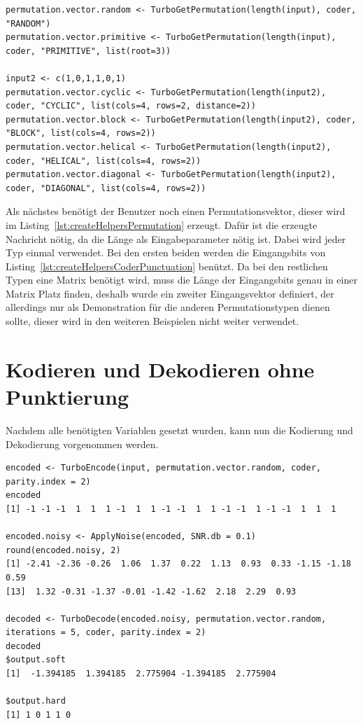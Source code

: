 \begin{lstlisting}[caption=Erzeugung von verschiedenen Permutationsvektoren, label={lst:createHelpersPermutation}, float=!th]
permutation.vector.random <- TurboGetPermutation(length(input), coder, "RANDOM")
permutation.vector.primitive <- TurboGetPermutation(length(input), coder, "PRIMITIVE", list(root=3))

input2 <- c(1,0,1,1,0,1)
permutation.vector.cyclic <- TurboGetPermutation(length(input2), coder, "CYCLIC", list(cols=4, rows=2, distance=2))
permutation.vector.block <- TurboGetPermutation(length(input2), coder, "BLOCK", list(cols=4, rows=2))
permutation.vector.helical <- TurboGetPermutation(length(input2), coder, "HELICAL", list(cols=4, rows=2))
permutation.vector.diagonal <- TurboGetPermutation(length(input2), coder, "DIAGONAL", list(cols=4, rows=2))
\end{lstlisting}

Als nächstes benötigt der Benutzer noch einen Permutationsvektor, dieser wird im Listing~\ref{lst:createHelpersPermutation} erzeugt. Dafür ist die erzeugte Nachricht nötig, da die Länge als Eingabeparameter nötig ist. Dabei wird jeder Typ einmal verwendet. Bei den ersten beiden werden die Eingangsbits von Listing~\ref{lst:createHelpersCoderPunctuation} benützt. Da bei den restlichen Typen eine Matrix benötigt wird, muss die Länge der Eingangsbits genau in einer Matrix Platz finden, deshalb wurde ein zweiter Eingangsvektor definiert, der allerdings nur als Demonstration für die anderen Permutationstypen dienen sollte, dieser wird in den weiteren Beispielen nicht weiter verwendet.

\FloatBarrier
\section{Kodieren und Dekodieren ohne Punktierung}
\label{sec:example_withoutPunctuation}
Nachdem alle benötigten Variablen gesetzt wurden, kann nun die Kodierung und Dekodierung vorgenommen werden.

\begin{lstlisting}[caption=Kodierung und Dekodierung ohne Punktierung, label={lst:encodeDecodeWithoutPunctuation}, float=!th]
encoded <- TurboEncode(input, permutation.vector.random, coder, parity.index = 2)
encoded
[1] -1 -1 -1  1  1  1 -1  1  1 -1 -1  1  1 -1 -1  1 -1 -1  1  1  1

encoded.noisy <- ApplyNoise(encoded, SNR.db = 0.1)
round(encoded.noisy, 2)
[1] -2.41 -2.36 -0.26  1.06  1.37  0.22  1.13  0.93  0.33 -1.15 -1.18  0.59
[13]  1.32 -0.31 -1.37 -0.01 -1.42 -1.62  2.18  2.29  0.93

decoded <- TurboDecode(encoded.noisy, permutation.vector.random, iterations = 5, coder, parity.index = 2)
decoded
$output.soft
[1]  -1.394185  1.394185  2.775904 -1.394185  2.775904

$output.hard
[1] 1 0 1 1 0
\end{lstlisting}

